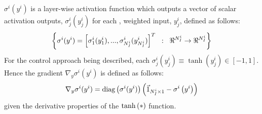 			$\sigma^{i}(y^{i})$ is a layer-wise activation function which outputs a vector of scalar activation outputs, $\sigma_{j}^{i}(y_{j}^{i}) $ for each \Jth, weighted input, $y_{j}^{i}$, defined as follows:
			\begin{equation*}
				\left\{ \sigma^{i}(y^{i}) = \left[ \sigma_{1}^{i}(y_{1}^{i}),...,\sigma_{N_{I}^{i}}^{i}(y_{N_{I}^{i}}^{i}) \right]^{T} \hspace{2mm} : \hspace{2mm} \Re^{N_{I}^{i}} \rightarrow \Re^{N_{I}^{i}}\right\}
			\end{equation*}
For the control approach being described, each $\sigma_{j}^{i}(y_{j}^{i}) \equiv \tanh(y_{j}^{i}) \in [-1,1]$. Hence the gradient $\nabla_{y} \sigma^{i}(y^{i})$ is defined as follows: 
			\begin{equation}
				\nabla_{y} \sigma^{i}(y^{i})  = \text{diag}\left(\sigma^{i}(y^{i})\right) \left(\vec{1}_{N_{I}^{i}\times1} - \sigma^{i}\left(y^{i} \right) \right)
				\label{eq::bp_sigmoid_deriv}
			\end{equation} 
			given the derivative properties of the $\tanh\left(*\right)$ function.
			

